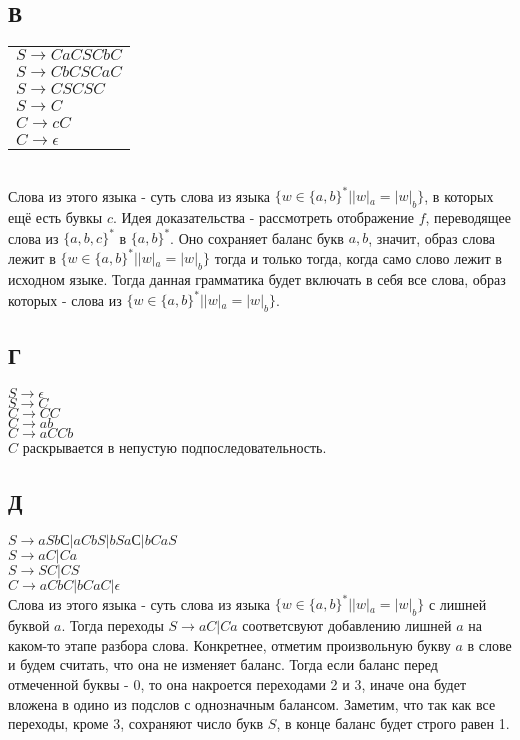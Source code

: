 \documentclass{article}
\begin{document}
    \subsection{В}
    \begin{tabular}{l}
    $ S \to CaCSCbC $\\
    $ S \to CbCSCaC$\\
    $ S \to CSCSC$\\
    $ S \to C$\\
    $ C \to cC $\\
    $ C \to \epsilon$\\
    \end{tabular}\\
    Слова из этого языка - суть слова из языка $\{ w \in \{a, b\}^* | |w|_a = |w|_b \} $, в которых ещё есть бувкы $c$.
    Идея доказательства - рассмотреть отображение $f$, переводящее слова из $\{a, b, c \}^*$ в $\{a, b\}^* $.
    Оно сохраняет баланс букв $a, b$, значит, образ слова лежит в $\{ w \in \{a, b\}^* | |w|_a = |w|_b \} $
    тогда и только тогда, когда само слово лежит в исходном языке. Тогда данная грамматика будет
    включать в себя все слова, образ которых - слова из $\{ w \in \{a, b\}^* | |w|_a = |w|_b \} $.
    \subsection{Г}
    $ S \to \epsilon$\\
    $ S \to C$\\
    $ C \to CC $\\
    $ C \to ab $\\
    $ C \to aCCb $\\
    $C$ раскрывается в непустую подпоследовательность.
    \subsection{Д}
    $ S \to aSbС | aCbS | bSaС | bCaS  $ \\
    $ S \to aC|Ca $ \\
    $ S \to SC | CS $\\
    $ C \to aCbC | bCaC | \epsilon$\\
    Слова из этого языка - суть слова из языка $\{ w \in \{a, b\}^* | |w|_a = |w|_b \} $ с лишней буквой $a$. 
    Тогда переходы $ S \to aC|Ca $ соответсвуют добавлению лишней $a$ на каком-то этапе разбора слова.
    Конкретнее, отметим произвольную букву $a$ в слове и будем считать, что она не изменяет баланс. Тогда 
    если баланс перед отмеченной буквы - 0, то она накроется переходами 2 и 3, иначе она будет вложена
    в одино из подслов с однозначным балансом. Заметим, что так как все переходы, кроме 3, сохраняют число
    букв $S$, в конце баланс будет строго равен 1.
\end{document}
